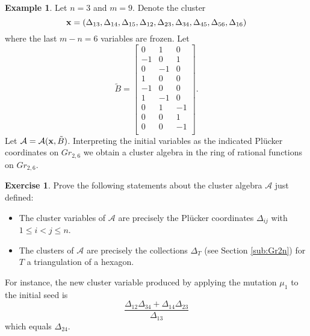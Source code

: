 \documentclass{amsart}
\theoremstyle{definition}
\newtheorem{example}[theorem]{Example}
\newtheorem{subexercise}{Exercise}[theorem]
\theoremstyle{remark}
\numberwithin{equation}{section}
\newcommand{\cA}{{\mathcal{A}}}
\newcommand{\x}{{\bf x}}
\begin{document}
	\begin{example}
		Let $n=3$ and $m=9$.  Denote the cluster 
		\begin{displaymath}
			\x = (\Delta_{13},\Delta_{14},\Delta_{15}, \Delta_{12},\Delta_{23},\Delta_{34},\Delta_{45},\Delta_{56},\Delta_{16})
		\end{displaymath}
		where the last $m-n=6$ variables are frozen.  Let
		\begin{displaymath}
			\tilde{B} = \left[\begin{array}{ccc}
			0 & 1 & 0 \\
			-1 & 0 & 1 \\
			0 & -1 & 0 \\
			1 & 0 & 0 \\
			-1 & 0 & 0 \\
			1 & -1 & 0 \\
			0 & 1 & -1 \\
			0 & 0 & 1 \\
			0 & 0 & -1 \\
			\end{array}
			\right].
		\end{displaymath}
		Let $\cA = \cA(\x,\tilde{B})$.  Interpreting the initial variables as the indicated Pl\"ucker coordinates on $Gr_{2,6}$ we obtain a cluster algebra in the ring of rational functions on $Gr_{2,6}$.
		\begin{subexercise}
            Prove the following statements about the cluster algebra $\cA$ just defined:
			\begin{itemize}
			\item The cluster variables of $\cA$ are precisely the Pl\"ucker coordinates $\Delta_{ij}$ with $1 \leq i < j \leq n$.
			\item The clusters of $\cA$ are precisely the collections $\Delta_T$ (see Section \ref{sub:Gr2n}) for $T$ a triangulation of a hexagon. 
			\end{itemize}
		\end{subexercise}
		For instance, the new cluster variable produced by applying the mutation $\mu_1$ to the initial seed is
		\begin{displaymath}
		\frac{\Delta_{12}\Delta_{34} + \Delta_{14}\Delta_{23}}{\Delta_{13}}
		\end{displaymath}
		which equals $\Delta_{24}$.
	\end{example}
	
\end{document}

